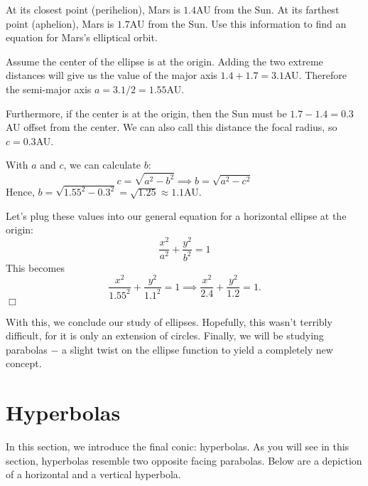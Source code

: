 \documentclass[../book.tex]{subfiles}
\begin{document}
\begin{example}
At its closest point (perihelion), Mars is $1.4$AU from the Sun.  At its farthest point (aphelion), Mars is $1.7$AU from the Sun.  Use this information to find an equation for Mars's elliptical orbit.
\end{example}
\begin{solution}
Assume the center of the ellipse is at the origin.  Adding the two extreme distances will give us the value of the major axis $1.4+1.7=3.1$AU.  Therefore the semi-major axis $a= 3.1/2 = 1.55$AU.  

Furthermore, if the center is at the origin, then the Sun must be $1.7-1.4=0.3$AU offset from the center.  We can also call this distance the focal radius, so $c=0.3$AU.  

With $a$ and $c$, we can calculate $b$:
$$ c = \sqrt{a^2-b^2} \implies b = \sqrt{a^2-c^2} $$
Hence, $b = \sqrt{1.55^2-0.3^2} = \sqrt{1.25} \approx 1.1$AU.  

Let's plug these values into our general equation for a horizontal ellipse at the origin:
$$ \frac{x^2}{a^2} + \frac{y^2}{b^2} = 1 $$
This becomes
$$ \frac{x^2}{1.55^2} + \frac{y^2}{1.1^2} = 1 \implies \frac{x^2}{2.4} + \frac{y^2}{1.2} = 1.$$ $\Box$
\end{solution}
With this, we conclude our study of ellipses.  Hopefully, this wasn't terribly difficult, for it is only an extension of circles.  Finally, we will be studying parabolas $-$ a slight twist on the ellipse function to yield a completely new concept.
\section{Hyperbolas}
\noindent In this section, we introduce the final conic: hyperbolas.  As you will see in this section, hyperbolas resemble two opposite facing parabolas. Below are a depiction of a horizontal and a vertical hyperbola.

\begin{figure}[!h]
    \centering
\end{figure}
\end{document}
